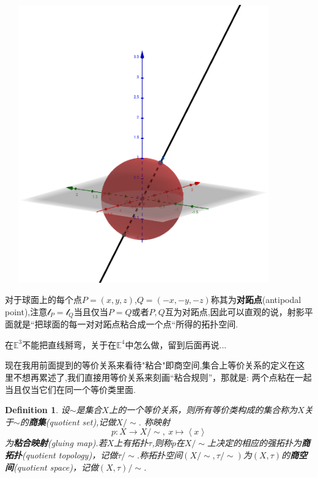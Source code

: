 \documentclass{article}
\newtheorem{definition}[theorem]{Definition}
\newcommand*{\xfunc}[4]{{#2}\colon{#3}{#1}{#4}}
\newcommand*{\func}[3]{\xfunc{\to}{#1}{#2}{#3}}
\begin{document}
\begin{center}
\includegraphics[width=12cm, height=12cm]{images/antipodal_point.png}
\end{center}

对于球面上的每个点$P=(x,y,z)$,$Q=(-x,-y,-z)$称其为\textbf{对跖点}(antipodal point),注意$\mathcal{l}_P=\mathcal{l}_Q$当且仅当$P=Q$或者$P,Q$互为对跖点,因此可以直观的说，射影平面就是“把球面的每一对对跖点粘合成一个点“所得的拓扑空间.

在$\mathbb{E}^3$不能把直线掰弯，关于在$\mathbb{E}^4$中怎么做，留到后面再说...

现在我用前面提到的等价关系来看待"粘合"即商空间,集合上等价关系的定义在这里不想再累述了,我们直接用等价关系来刻画“粘合规则”，那就是: 两个点粘在一起当且仅当它们在同一个等价类里面. 

\begin{definition}
设$\sim$是集合$X$上的一个等价关系，则所有等价类构成的集合称为$X$关于$\sim$的\textbf{商集}(quotient set),记做$X / \sim$. 称映射\[\func{p}{X}{X / \sim},\ x \mapsto \left<x\right>\]为\textbf{粘合映射}(gluing map).若$X$上有拓扑$\tau$,则称$p$在$X / \sim$上决定的相应的强拓扑为\textbf{商拓扑}(quotient topology)，记做$\tau / \sim$.称拓扑空间$(X / \sim, \tau /\sim)$为$(X,\tau)$的\textbf{商空间}(quotient space)，记做$(X,\tau) / \sim$.
\end{definition}
\end{document}
